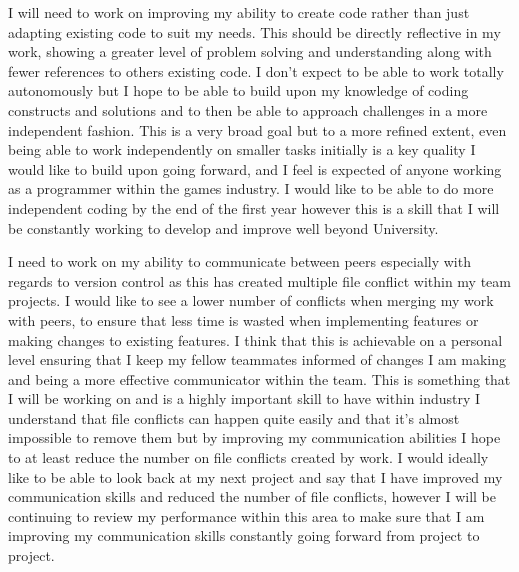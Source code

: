 \documentclass{scrartcl}
\begin{document}
I will need to work on improving my ability to create code rather than just adapting existing code to suit my needs. This should be directly reflective in my work, showing a greater level of problem solving and understanding along with fewer references to others existing code. I don't expect to be able to work totally autonomously but I hope to be able to build upon my knowledge of coding constructs and solutions and to then be able to approach challenges in a more independent fashion. This is a very broad goal but to a more refined extent, even being able to work independently on smaller tasks initially is a key quality I would like to build upon going forward, and I feel is expected of anyone working as a programmer within the games industry. I would like to be able to do more independent coding by the end of the first year however this is a skill that I will be constantly working to develop and improve well beyond University. \linebreak

I need to work on my ability to communicate between peers especially with regards to version control as this has created multiple file conflict within my team projects. I would like to see a lower number of conflicts when merging my work with peers, to ensure that less time is wasted when implementing features or making changes to existing features. I think that this is achievable on a personal level ensuring that I keep my fellow teammates informed of changes I am making and being a more effective communicator within the team. This is something that I will be working on and is a highly important skill to have within industry I understand that file conflicts can happen quite easily and that it's almost impossible to remove them but by improving my communication abilities I hope to at least reduce the number on file conflicts created by work. I would ideally like to be able to look back at my next project and say that I have improved my communication skills and reduced the number of file conflicts, however I will be continuing to review my performance within this area to make sure that I am improving my communication skills constantly going forward from project to project. \linebreak
\end{document}

